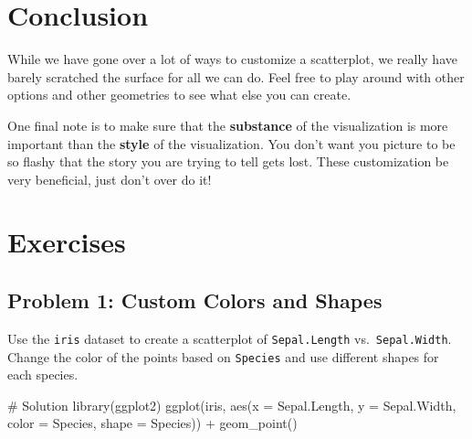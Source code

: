 \documentclass[
  letterpaper,
  DIV=11,
  numbers=noendperiod]{scrreprt}
\newenvironment{Shaded}{\begin{snugshade}}{\end{snugshade}}
\newcommand{\AttributeTok}[1]{\textcolor[rgb]{0.40,0.45,0.13}{#1}}
\newcommand{\CommentTok}[1]{\textcolor[rgb]{0.37,0.37,0.37}{#1}}
\newcommand{\FunctionTok}[1]{\textcolor[rgb]{0.28,0.35,0.67}{#1}}
\newcommand{\NormalTok}[1]{\textcolor[rgb]{0.00,0.23,0.31}{#1}}
\newcommand{\SpecialCharTok}[1]{\textcolor[rgb]{0.37,0.37,0.37}{#1}}
\begin{document}
\section*{Conclusion}\label{conclusion-7}


While we have gone over a lot of ways to customize a scatterplot, we
really have barely scratched the surface for all we can do. Feel free to
play around with other options and other geometries to see what else you
can create.

One final note is to make sure that the \textbf{substance} of the
visualization is more important than the \textbf{style} of the
visualization. You don't want you picture to be so flashy that the story
you are trying to tell gets lost. These customization be very
beneficial, just don't over do it!

\section*{Exercises}\label{exercises-16}


\subsection*{Problem 1: Custom Colors and
Shapes}\label{problem-1-custom-colors-and-shapes}

Use the \texttt{iris} dataset to create a scatterplot of
\texttt{Sepal.Length} vs.~\texttt{Sepal.Width}. Change the color of the
points based on \texttt{Species} and use different shapes for each
species.

\begin{Shaded}
\begin{Highlighting}[]
\CommentTok{\# Solution}
\FunctionTok{library}\NormalTok{(ggplot2)}
\FunctionTok{ggplot}\NormalTok{(iris, }\FunctionTok{aes}\NormalTok{(}\AttributeTok{x =}\NormalTok{ Sepal.Length, }\AttributeTok{y =}\NormalTok{ Sepal.Width, }\AttributeTok{color =}\NormalTok{ Species, }\AttributeTok{shape =}\NormalTok{ Species)) }\SpecialCharTok{+}
  \FunctionTok{geom\_point}\NormalTok{()}
\end{Highlighting}
\end{Shaded}
\end{document}
